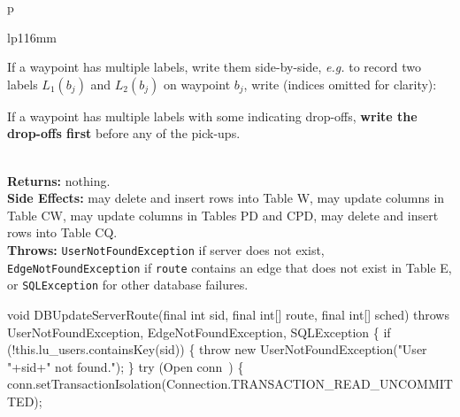 \begin{tabular}{p{\textwidth}}
\begin{tabular}{lp{116mm}}

If a waypoint has multiple labels, write them side-by-side, \textit{e.g.}
to record two labels $L_1(b_j)$ and $L_2(b_j)$ on waypoint $b_j$, write
(indices omitted for clarity):


If a waypoint has multiple labels with some indicating drop-offs, \textbf{write
the drop-offs first} before any of the pick-ups.
\end{tabular}\\
\textbf{Returns:} nothing.\\
\textbf{Side Effects:} may delete and insert rows into Table W, may
update columns in Table CW, may update columns in Tables PD and CPD,
may delete and insert rows into Table CQ.\\
\textbf{Throws:} {\tt{}UserNotFoundException} if server does not exist,
{\tt{}EdgeNotFoundException} if {\tt{}route} contains an edge that does not exist in
Table E, or {\tt{}SQLException} for other database failures.\\
\bottomrule
\end{tabular}
\nwenddocs{}\endmoddef{}
void DBUpdateServerRoute(final int sid, final int[] route, final int[] sched)
throws UserNotFoundException, EdgeNotFoundException, SQLException \{
  if (!this.lu_users.containsKey(sid)) \{
    throw new UserNotFoundException("User "+sid+" not found.");
  \}
  try (\LA{}Open \code{}conn\edoc{}~{\nwtagstyle{}}\RA{}) \{
    conn.setTransactionIsolation(Connection.TRANSACTION_READ_UNCOMMITTED);
